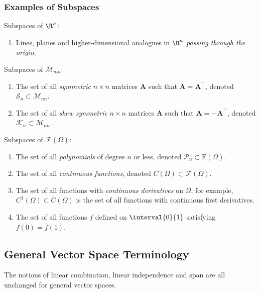 \documentclass{article}
\begin{document}
\begin{multicols*}{3}
    \subsubsection{Examples of Subspaces}
    Subspaces of \(\R^n\):
    \begin{enumerate}
        \item Lines, planes and higher-dimensional analogues in \(\R^n\) \emph{passing through the origin}.
    \end{enumerate}
    Subspaces of \(\mathscr{M}_{mn}\):
    \begin{enumerate}
        \item The set of all \emph{symmetric} \(n \times n\) matrices \(\symbf{A}\) such that \(\symbf{A} = \symbf{A}^\top\), denoted \(\mathscr{S}_n \subset \mathscr{M}_{nn}\).
        \item The set of all \emph{skew symmetric} \(n \times n\) matrices \(\symbf{A}\) such that \(\symbf{A} = -\symbf{A}^\top\), denoted \(\mathscr{K}_n \subset \mathscr{M}_{nn}\).
    \end{enumerate}
    Subspaces of \(\mathscr{F}\left( \Omega \right)\):
    \begin{enumerate}
        \item The set of all \emph{polynomials} of degree \(n\) or less, denoted \(\mathscr{P}_n \subset \mathrm{F}\left( \Omega \right)\).
        \item The set of all \emph{continuous functions}, denoted \(C\left( \Omega \right) \subset \mathscr{F}\left( \Omega \right)\).
        \item The set of all functions with \emph{continuous derivatives} on \(\Omega\), for example, \(C^1\left( \Omega \right) \subset C\left( \Omega \right)\)
              is the set of all functions with continuous first derivatives.
        \item The set of all functions \(f\) defined on \(\interval{0}{1}\) satisfying \(f\left( 0 \right) = f\left( 1 \right)\).
    \end{enumerate}
    \subsection{General Vector Space Terminology}
    The notions of linear combination, linear independence and span are all unchanged for general vector spaces.


\end{multicols*}
\end{document}

